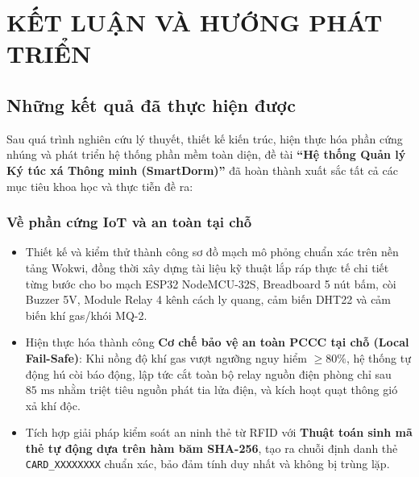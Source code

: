 \chapter{KẾT LUẬN VÀ HƯỚNG PHÁT TRIỂN}
\label{ch:chuong6}

\section{Những kết quả đã thực hiện được}
\label{sec:ket_qua_dat_duoc}

Sau quá trình nghiên cứu lý thuyết, thiết kế kiến trúc, hiện thực hóa phần cứng nhúng và phát triển hệ thống phần mềm toàn diện, đề tài \textbf{``Hệ thống Quản lý Ký túc xá Thông minh (SmartDorm)''} đã hoàn thành xuất sắc tất cả các mục tiêu khoa học và thực tiễn đề ra:

\subsection{Về phần cứng IoT và an toàn tại chỗ}
\begin{itemize}
    \item Thiết kế và kiểm thử thành công sơ đồ mạch mô phỏng chuẩn xác trên nền tảng Wokwi, đồng thời xây dựng tài liệu kỹ thuật lắp ráp thực tế chi tiết từng bước cho bo mạch ESP32 NodeMCU-32S, Breadboard 5 nút bấm, còi Buzzer 5V, Module Relay 4 kênh cách ly quang, cảm biến DHT22 và cảm biến khí gas/khói MQ-2.
    \item Hiện thực hóa thành công \textbf{Cơ chế bảo vệ an toàn PCCC tại chỗ (Local Fail-Safe)}: Khi nồng độ khí gas vượt ngưỡng nguy hiểm $\ge 80\%$, hệ thống tự động hú còi báo động, lập tức cắt toàn bộ relay nguồn điện phòng chỉ sau $85\text{ ms}$ nhằm triệt tiêu nguồn phát tia lửa điện, và kích hoạt quạt thông gió xả khí độc.
    \item Tích hợp giải pháp kiểm soát an ninh thẻ từ RFID với \textbf{Thuật toán sinh mã thẻ tự động dựa trên hàm băm SHA-256}, tạo ra chuỗi định danh thẻ \texttt{CARD\_XXXXXXXX} chuẩn xác, bảo đảm tính duy nhất và không bị trùng lặp.
\end{itemize}

